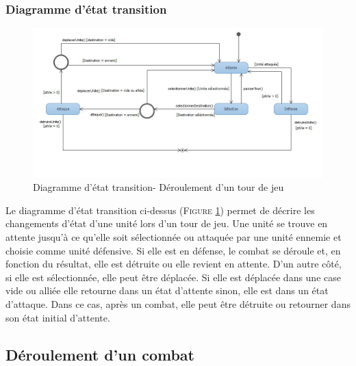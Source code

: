 \documentclass[a4paper,11pt]{article}
\begin{document}
		\subsubsection{Diagramme d'état transition}
			\begin{figure}[ht!]
				\includegraphics[width=15cm]{Diagrammes/Tour/ettour.png}
				\caption{Diagramme d'état transition- Déroulement d'un tour de jeu}
				\label{fig:ettour}
				\end{figure}
			\vspace*{1cm}
			Le diagramme d'état transition ci-dessus (\textsc{Figure \ref{fig:ettour}}) permet de décrire les changements d'état d'une unité lors d'un tour de jeu. Une unité se trouve en attente jusqu'à ce qu'elle soit sélectionnée ou attaquée par une unité ennemie et choisie comme unité défensive. Si elle est en défense, le combat se déroule et, en fonction du résultat, elle est détruite ou elle revient en attente. D'un autre côté, si elle est sélectionnée, elle peut être déplacée. Si elle est déplacée dans une case vide ou alliée elle retourne dans un état d'attente sinon, elle est dans un état d'attaque. Dans ce cas, après un combat, elle peut être détruite ou retourner dans son état initial d'attente.
			\newpage
			
	\subsection{Déroulement d'un combat}
\end{document}
